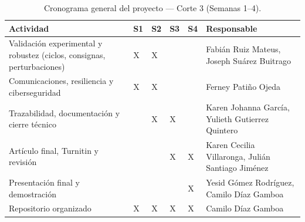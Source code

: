 \begin{table}[H]\centering\scriptsize
\caption{Cronograma general del proyecto — Corte 3 (Semanas 1--4).}
\label{tab:cronograma-corte3}
\begin{tabularx}{\textwidth}{L{4.0cm}*{4}{C{0.9cm}}L{4.3cm}}\toprule
\textbf{Actividad} & \textbf{S1} & \textbf{S2} & \textbf{S3} & \textbf{S4} & \textbf{Responsable}\\\midrule
Validación experimental y robustez (ciclos, consignas, perturbaciones) & X & X & & & Fabián Ruiz Mateus, Joseph Suárez Buitrago\\
Comunicaciones, resiliencia y ciberseguridad & X & X & & & Ferney Patiño Ojeda\\
Trazabilidad, documentación y cierre técnico & & X & X & & Karen Johanna García, Yulieth Gutierrez Quintero\\
Artículo final, Turnitin y revisión & & & X & X & Karen Cecilia Villaronga, Julián Santiago Jiménez\\
Presentación final y demostración & & & & X & Yesid Gómez Rodríguez, Camilo Díaz Gamboa\\\bottomrule
Repositorio organizado & X & X & X & X & Camilo Díaz Gamboa\\\bottomrule
\end{tabularx}\end{table}